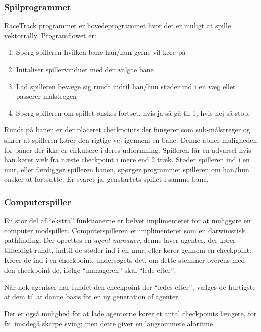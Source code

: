 \subsubsection{Spilprogrammet}
RaceTrack programmet er hovedeprogrammet hvor det er muligt at spille vektorrally. Programflowet er:
\begin{enumerate}
  \item Spørg spilleren hvilken bane han/hun gerne vil køre på
  \item Initaliser spillervinduet med den valgte bane
  \item Lad spilleren bevæge sig rundt indtil han/hun støder ind i en væg eller passerer målstregen
  \item Spørg spilleren om spillet ønskes fortset, hvis ja så gå til 1, hvis nej så stop.
\end{enumerate}
Rundt på banen er der placeret checkpoints der fungerer som sub-målstreger og sikrer at spilleren kører den rigtige vej igennem en bane.
Denne åbner muligheden for baner der ikke er cirkulære i deres udformning.
Spilleren får en advarsel hvis han kører væk fra næste checkpoint i  mere end 2 træk.
Støder spilleren ind i en mur, eller færdiggør spilleren banen, spørger programmet spilleren om han/hun ønsker at fortsætte.
Er svaret ja, genstartets spillet i samme bane.

\subsubsection{Computerspiller}
En stor del af ``ekstra'' funktionerne er belvet implimenteret for at muliggøre en computer modspiller.
Computerspilleren er implimenteret som en darwinistisk pathfinding.
Der oprettes en \emph{agent manager}, denne laver agenter, der kører tilfældigt rundt,
indtil de støder ind i en mur, eller kører gennem en checkpoint.
Kører de ind i en checkpoint, undersøgets det, om dette stemmer overens med den checkpoint de, ifølge ``manageren'' skal ``lede efter''.

Når nok agentser har fundet den checkpoint der ``ledes efter'', vælges de hurtigste af dem til at danne basis for en ny generation af agenter.

Der er også mulighed for at lade agenterne kører et antal checkpoints længere,
for fx. imødegå skarpe sving; men dette giver en langsommere aloritme.

